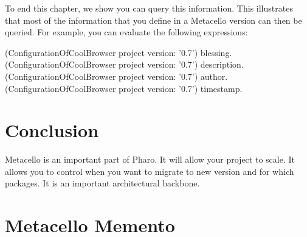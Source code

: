 \documentclass[a4paper,10pt,twoside]{book}
\begin{document}
To end this chapter, we show you can query this information. This illustrates that most of the information that you define in a Metacello version can then be queried. For example, you can evaluate the following expressions:

\begin{code}{}
(ConfigurationOfCoolBrowser project version: '0.7') blessing.
(ConfigurationOfCoolBrowser project version: '0.7') description.
(ConfigurationOfCoolBrowser project version: '0.7') author.
(ConfigurationOfCoolBrowser project version: '0.7') timestamp.
\end{code}


\section{Conclusion}
Metacello is an important part of Pharo. It will allow your project to scale. It allows you to control when you want to migrate to new version and for which packages. It is an important architectural backbone.


\newpage

\section{Metacello Memento}
\end{document}
